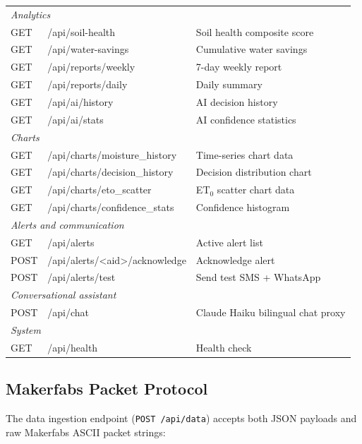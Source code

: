 \documentclass[12pt,a4paper]{report}
\begin{document}
\begin{table}[H]
\begin{tabularx}{\textwidth}{llX}
\midrule
\multicolumn{3}{l}{\textit{Analytics}} \\
GET  & /api/soil-health                    & Soil health composite score \\
GET  & /api/water-savings                  & Cumulative water savings \\
GET  & /api/reports/weekly                 & 7-day weekly report \\
GET  & /api/reports/daily                  & Daily summary \\
GET  & /api/ai/history                     & AI decision history \\
GET  & /api/ai/stats                       & AI confidence statistics \\
\midrule
\multicolumn{3}{l}{\textit{Charts}} \\
GET  & /api/charts/moisture\_history       & Time-series chart data \\
GET  & /api/charts/decision\_history       & Decision distribution chart \\
GET  & /api/charts/eto\_scatter            & ET$_0$ scatter chart data \\
GET  & /api/charts/confidence\_stats       & Confidence histogram \\
\midrule
\multicolumn{3}{l}{\textit{Alerts and communication}} \\
GET  & /api/alerts                         & Active alert list \\
POST & /api/alerts/\textless aid\textgreater/acknowledge & Acknowledge alert \\
POST & /api/alerts/test                    & Send test SMS + WhatsApp \\
\midrule
\multicolumn{3}{l}{\textit{Conversational assistant}} \\
POST & /api/chat                           & Claude Haiku bilingual chat proxy \\
\midrule
\multicolumn{3}{l}{\textit{System}} \\
GET  & /api/health                         & Health check \\
\bottomrule
\end{tabularx}
\end{table}

\subsection{Makerfabs Packet Protocol}

The data ingestion endpoint (\texttt{POST /api/data}) accepts both JSON payloads and raw Makerfabs ASCII packet strings:
\end{document}
